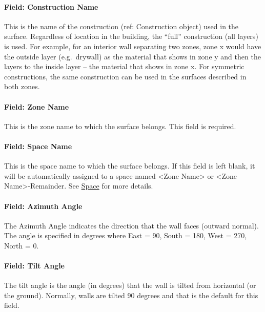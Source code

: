 \paragraph{Field: Construction Name}\label{field-construction-name-1-001}

This is the name of the construction (ref: Construction object) used in the surface. Regardless of location in the building, the ``full'' construction (all layers) is used. For example, for an interior wall separating two zones, zone x would have the outside layer (e.g.~drywall) as the material that shows in zone y and then the layers to the inside layer -- the material that shows in zone x. For symmetric constructions, the same construction can be used in the surfaces described in both zones.

\paragraph{Field: Zone Name}\label{field-zone-name-1-009}

This is the zone name to which the surface belongs. This field is required.

\paragraph{Field: Space Name}\label{field-space-name-1-009}

This is the space name to which the surface belongs. If this field is left blank, it will be automatically assigned to a space named <Zone Name> or <Zone Name>-Remainder. See \hyperref[space]{Space} for more details.

\paragraph{Field: Azimuth Angle}\label{field-azimuth-angle-1}

The Azimuth Angle indicates the direction that the wall faces (outward normal). The angle is specified in degrees where East = 90, South = 180, West = 270, North = 0.

\paragraph{Field: Tilt Angle}\label{field-tilt-angle-1}

The tilt angle is the angle (in degrees) that the wall is tilted from horizontal (or the ground). Normally, walls are tilted 90 degrees and that is the default for this field.

